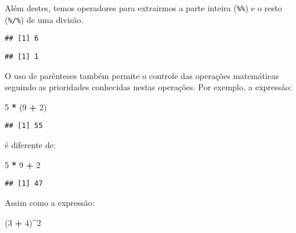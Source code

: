 \documentclass[
]{book}
\newenvironment{Shaded}{\begin{snugshade}}{\end{snugshade}}
\newcommand{\DecValTok}[1]{\textcolor[rgb]{0.00,0.00,0.81}{#1}}
\newcommand{\NormalTok}[1]{#1}
\newcommand{\OperatorTok}[1]{\textcolor[rgb]{0.81,0.36,0.00}{\textbf{#1}}}
\newcommand{\StringTok}[1]{\textcolor[rgb]{0.31,0.60,0.02}{#1}}
\begin{document}
Além destes, temos operadores para extrairmos a parte inteira (\texttt{\%\%}) e o resto (\texttt{\%/\%}) de uma divisão.

\begin{Shaded}
\end{Shaded}

\begin{verbatim}
## [1] 6
\end{verbatim}

\begin{Shaded}
\end{Shaded}

\begin{verbatim}
## [1] 1
\end{verbatim}

O uso de parênteses também permite o controle das operações matemáticas seguindo as prioridades conhecidas nestas operações. Por exemplo, a expressão:

\begin{Shaded}
\begin{Highlighting}[]
\DecValTok{5} \OperatorTok{*}\StringTok{ }\NormalTok{(}\DecValTok{9} \OperatorTok{+}\StringTok{ }\DecValTok{2}\NormalTok{)}
\end{Highlighting}
\end{Shaded}

\begin{verbatim}
## [1] 55
\end{verbatim}

é diferente de:

\begin{Shaded}
\begin{Highlighting}[]
\DecValTok{5} \OperatorTok{*}\StringTok{ }\DecValTok{9} \OperatorTok{+}\StringTok{ }\DecValTok{2}
\end{Highlighting}
\end{Shaded}

\begin{verbatim}
## [1] 47
\end{verbatim}

Assim como a expressão:

\begin{Shaded}
\begin{Highlighting}[]
\NormalTok{(}\DecValTok{3} \OperatorTok{+}\StringTok{ }\DecValTok{4}\NormalTok{)}\OperatorTok{^}\DecValTok{2}
\end{Highlighting}
\end{Shaded}
\end{document}
